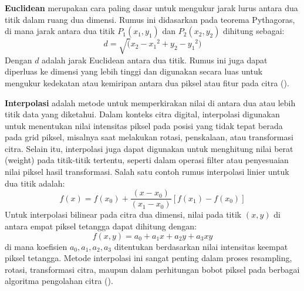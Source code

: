   \textbf{Euclidean} merupakan cara paling dasar untuk mengukur jarak lurus antara dua titik dalam ruang dua dimensi. Rumus ini didasarkan pada teorema Pythagoras, di mana jarak antara dua titik \(P_1(x_1, y_1)\) dan \(P_2(x_2, y_2)\) dihitung sebagai:
\begin{equation}
  d = \sqrt({x_2 - x_1}^2 + {y_2 - y_1}^2)
  \label{eq:euclidean}
\end{equation}
  Dengan \(d\) adalah jarak Euclidean antara dua titik. Rumus ini juga dapat diperluas ke dimensi yang lebih tinggi dan digunakan secara luas untuk mengukur kedekatan atau kemiripan antara dua piksel atau fitur pada citra (\cite[hlm. 34]{Gonzalez2018}).

  \textbf{Interpolasi} adalah metode untuk memperkirakan nilai di antara dua atau lebih titik data yang diketahui. Dalam konteks citra digital, interpolasi digunakan untuk menentukan nilai intensitas piksel pada posisi yang tidak tepat berada pada grid piksel, misalnya saat melakukan rotasi, penskalaan, atau transformasi citra. Selain itu, interpolasi juga dapat digunakan untuk menghitung nilai berat (weight) pada titik-titik tertentu, seperti dalam operasi filter atau penyesuaian nilai piksel hasil transformasi. Salah satu contoh rumus interpolasi linier untuk dua titik adalah:
\begin{equation}
  f(x) = f(x_0) + \frac{(x - x_0)}{(x_1 - x_0)} \left[ f(x_1) - f(x_0) \right]
  \label{eq:interpolasi-linier}
\end{equation}
  Untuk interpolasi bilinear pada citra dua dimensi, nilai pada titik \((x, y)\) di antara empat piksel tetangga dapat dihitung dengan:
\begin{equation*}
  f(x, y) = a_0 + a_1x + a_2y + a_3xy
  \label{eq:interpolasi-bilinear}
\end{equation*}
  di mana koefisien \(a_0, a_1, a_2, a_3\) ditentukan berdasarkan nilai intensitas keempat piksel tetangga. Metode interpolasi ini sangat penting dalam proses resampling, rotasi, transformasi citra, maupun dalam perhitungan bobot piksel pada berbagai algoritma pengolahan citra (\cite[hlm. 89--91]{Gonzalez2018}).





